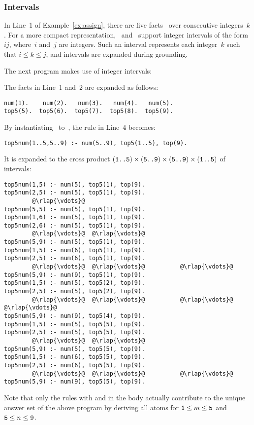 \subsubsection{Intervals}\label{subsec:gringo:interval}

In Line~1 of Example~\ref{ex:assign},
there are five facts~
over consecutive integers~$k$.
For a more compact representation,
\gringo\ and \clingo\ support integer intervals of the form $i$$j$,
where~$i$ and~$j$ are integers.
Such an interval represents each integer~$k$ such that $i\leq k\leq j$,
and intervals are expanded during grounding.

\begin{example}\label{ex:int}
The next program makes use of integer intervals:
%

%
The facts in Line~1 and~2 are expanded as follows:
%
\begin{lstlisting}[numbers=none]
num(1).    num(2).   num(3).   num(4).   num(5).
top5(5).  top5(6).  top5(7).  top5(8).  top5(9).
\end{lstlisting}
%
By instantiating~ to~,
the rule in Line~4 becomes:
%
\begin{lstlisting}[numbers=none]
top5num(1..5,5..9) :- num(5..9), top5(1..5), top(9).
\end{lstlisting}
%
It is expanded to the cross product
$(\texttt{\texttt{1}..\texttt{5}})\times
 (\texttt{\texttt{5}..\texttt{9}})\times
 (\texttt{\texttt{5}..\texttt{9}})\times
 (\texttt{\texttt{1}..\texttt{5}})$
of intervals:
%
\begin{lstlisting}[numbers=none,escapechar=@]
top5num(1,5) :- num(5), top5(1), top(9).
top5num(2,5) :- num(5), top5(1), top(9).
        @\rlap{\vdots}@
top5num(5,5) :- num(5), top5(1), top(9).
top5num(1,6) :- num(5), top5(1), top(9).
top5num(2,6) :- num(5), top5(1), top(9).
        @\rlap{\vdots}@  @\rlap{\vdots}@
top5num(5,9) :- num(5), top5(1), top(9).
top5num(1,5) :- num(6), top5(1), top(9).
top5num(2,5) :- num(6), top5(1), top(9).
        @\rlap{\vdots}@  @\rlap{\vdots}@          @\rlap{\vdots}@
top5num(5,9) :- num(9), top5(1), top(9).
top5num(1,5) :- num(5), top5(2), top(9).
top5num(2,5) :- num(5), top5(2), top(9).
        @\rlap{\vdots}@  @\rlap{\vdots}@          @\rlap{\vdots}@         @\rlap{\vdots}@
top5num(5,9) :- num(9), top5(4), top(9).
top5num(1,5) :- num(5), top5(5), top(9).
top5num(2,5) :- num(5), top5(5), top(9).
        @\rlap{\vdots}@  @\rlap{\vdots}@
top5num(5,9) :- num(5), top5(5), top(9).
top5num(1,5) :- num(6), top5(5), top(9).
top5num(2,5) :- num(6), top5(5), top(9).
        @\rlap{\vdots}@  @\rlap{\vdots}@          @\rlap{\vdots}@
top5num(5,9) :- num(9), top5(5), top(9).
\end{lstlisting}
%
Note that only the rules with
 and
%
in the body actually contribute to the unique answer set
of the above program by deriving all atoms 
for $\texttt{1}\leq m\leq\texttt{5}$ and $\texttt{5}\leq n\leq\texttt{9}$.
\eexample
\end{example}

